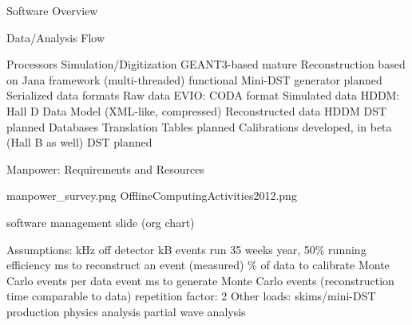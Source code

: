 Software Overview


Data/Analysis Flow

\I Processors
   \I Simulation/Digitization
      \I GEANT3-based
      \I mature
   \I Reconstruction
      \I based on Jana framework (multi-threaded)
      \I functional
   \I Mini-DST generator
      \I planned
\I Serialized data formats
   \I Raw data
      \I EVIO: CODA format
   \I Simulated data
      \I HDDM: Hall D Data Model (XML-like, compressed)
   \I Reconstructed data
      \I HDDM
   \I DST
      \I planned
\I Databases
   \I Translation Tables
      \I planned
   \I Calibrations
      \I developed, in beta (Hall B as well)
   \I DST
      \I planned


Manpower: Requirements and Resources

manpower_survey.png
OfflineComputingActivities2012.png 


software management slide (org chart)


\I Assumptions:
    kHz off detector
    kB events
   \I run 35 weeks year, 50\% running efficiency
    ms to reconstruct an event (measured)
   \% of data to calibrate
    Monte Carlo events per data event
    ms to generate Monte Carlo events (reconstruction time comparable to data)
   \I repetition factor: 2
   \I Other loads:
      \I skims/mini-DST production
      \I physics analysis
      \I partial wave analysis

